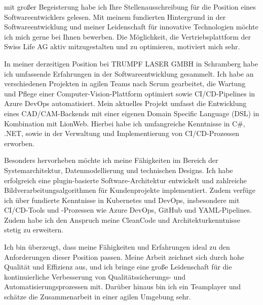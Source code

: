 \documentclass{ReCeiVe}         %
\begin{document}
\makecvheader[L]
\makelettertitle[R]

\begin{cvletter}

mit großer Begeisterung habe ich Ihre Stellenausschreibung für die Position eines Softwareentwicklers gelesen. Mit meinem fundierten Hintergrund in der Softwareentwicklung und meiner Leidenschaft für innovative Technologien möchte ich mich gerne bei Ihnen bewerben. Die Möglichkeit, die Vertriebsplattform der Swiss Life AG aktiv mitzugestalten und zu optimieren, motiviert mich sehr.\linebreak

In meiner derzeitigen Position bei TRUMPF LASER GMBH in Schramberg habe ich umfassende Erfahrungen in der Softwareentwicklung gesammelt. Ich habe an verschiedenen Projekten in agilen Teams nach Scrum gearbeitet, die Wartung und Pflege einer Computer-Vision-Plattform optimiert sowie CI/CD-Pipelines in Azure DevOps automatisiert. Mein aktuelles Projekt umfasst die Entwicklung eines CAD/CAM-Backends mit einer eigenen Domain Specific Language (DSL) in Kombination mit LionWeb. Hierbei habe ich umfangreiche Kenntnisse in C\#, .NET, sowie in der Verwaltung und Implementierung von CI/CD-Prozessen erworben.\linebreak

Besonders hervorheben möchte ich meine Fähigkeiten im Bereich der Systemarchitektur, Datenmodellierung und technischen Designs. Ich habe erfolgreich eine plugin-basierte Software-Architektur entwickelt und zahlreiche Bildverarbeitungsalgorithmen für Kundenprojekte implementiert. Zudem verfüge ich über fundierte Kenntnisse in Kubernetes und DevOps, insbesondere mit CI/CD-Tools und -Prozessen wie Azure DevOps, GitHub und YAML-Pipelines. Zudem habe ich den Anspruch meine CleanCode und Architekturkenntnisse stetig zu erweitern.\linebreak

Ich bin überzeugt, dass meine Fähigkeiten und Erfahrungen ideal zu den Anforderungen dieser Position passen. Meine Arbeit zeichnet sich durch hohe Qualität und Effizienz aus, und ich bringe eine große Leidenschaft für die kontinuierliche Verbesserung von Qualitätssicherungs- und Automatisierungsprozessen mit. Darüber hinaus bin ich ein Teamplayer und schätze die Zusammenarbeit in einer agilen Umgebung sehr.\linebreak


\end{cvletter}
\end{document}
